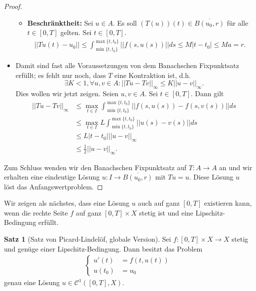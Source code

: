 \documentclass[a4paper]{article}
\theoremstyle{definition}
\newtheorem{theorem}{Satz}
\begin{document}
\begin{proof}
\begin{itemize}
\begin{itemize}
    \item \textbf{Beschränktheit:} Sei $u \in A$. Es soll $(T(u))(t) \in \overline{B(u_0,r)}$ für alle $t \in [0,T]$ gelten. Sei $t \in [0,T]$.
    \begin{align*}
        ||Tu(t) - u_0|| \leq \int^{\max \{t,t_0\}}_{\min \{t,t_0 \}} ||f(s,u(s))||ds \leq M|t-t_0| \leq Ma = r.
    \end{align*}
    \end{itemize}
    
    \item Damit sind fast alle Voraussetzungen von dem Banachschen Fixpunktsatz erfüllt; es fehlt nur noch, dass $T$ eine Kontraktion ist, d.h.
    \[
        \exists K < 1, \forall u,v \in A: ||Tu - Tv||_{\infty} \leq K ||u-v||_{\infty}.
    \]
    Dies wollen wir jetzt zeigen. Seien $u,v \in A$. Sei $t \in [0,T]$. Dann gilt
    \begin{align*}
        ||Tu - Tv||_{\infty} &\leq \max_{t \in I} \int^{\max\{t,t_0\}}_{\min\{t,t_0\}} ||f(s,u(s)) - f(s,v(s))|| ds \\
        &\leq  \max_{t \in I} L \int^{\max\{t,t_0\}}_{\min\{t,t_0\}} ||u(s) - v(s)|| ds\\
        &\leq L |t-t_0| ||u-v||_{\infty} \\
        &\leq \frac{1}{2}||u-v||_{\infty}.
    \end{align*}
\end{itemize}

Zum Schluss wenden wir den Banachschen Fixpunktsatz auf $T: A \to A$ an und wir erhalten eine eindeutige Lösung $u: I \to \overline{B(u_0,r)}$ mit $Tu = u$. Diese Lösung $u$ löst das Anfangswertproblem.
\end{proof}

Wir zeigen als nächstes, dass eine Lösung $u$ auch auf ganz $[0,T]$ existieren kann, wenn die rechte Seite $f$ auf ganz $[0,T] \times X$ stetig ist und eine Lipschitz-Bedingung erfüllt.

\begin{theorem}[Satz von Picard-Lindelöf, globale Version]
Sei $f:[0,T] \times X \to X$ stetig und genüge einer Lipschitz-Bedingung. Dann besitzt das Problem
\begin{align*}
    \begin{cases}
        u'(t) &= f(t, u(t)) \\
        u(t_0) &= u_0
    \end{cases}
\end{align*}
genau eine Lösung $u \in \mathcal C^{1}([0,T], X)$.
\end{theorem}
\end{document}

